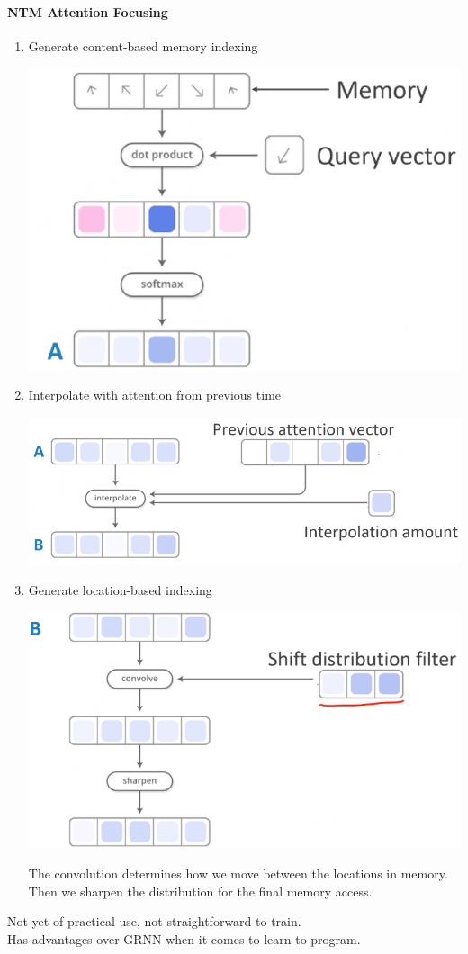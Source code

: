 \documentclass[10pt]{report}
\begin{document}
\paragraph{NTM Attention Focusing}

\begin{enumerate}
	\item Generate content-based memory indexing
	\begin{center}
		\includegraphics[scale=0.33]{135.png}
	\end{center}
	\item Interpolate with attention from previous time
	\begin{center}
		\includegraphics[scale=0.33]{136.png}
	\end{center}
	\item Generate location-based indexing
	\begin{center}
		\includegraphics[scale=0.33]{137.png}
	\end{center}
	The convolution determines how we move between the locations in memory.\\Then we sharpen the distribution for the final memory access.
\end{enumerate}
Not yet of practical use, not straightforward to train.\\
Has advantages over GRNN when it comes to learn to program.
\end{document}
